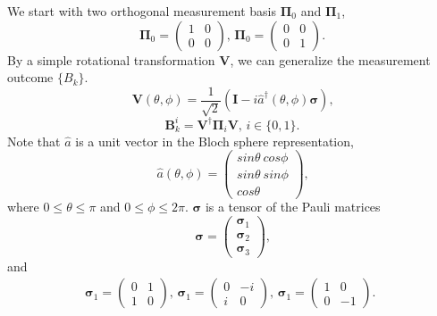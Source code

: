 \documentclass[%
 reprint,
 amsmath,amssymb,
 aps,
]{revtex4-1}
\begin{document}
We start with two orthogonal measurement basis $\boldsymbol{\Pi}_0$ and $\boldsymbol{\Pi}_1$,
\begin{equation}
\boldsymbol{\Pi}_0 = 
\left( \begin{array}{cc}
1 & 0 \\
0 & 0 \end{array} \right) \text{, }
\boldsymbol{\Pi}_0 = 
\left( \begin{array}{cc}
0 & 0 \\
0 & 1 \end{array} \right) \text{.}
\end{equation}
\noindent By a simple rotational transformation $\textbf{V}$, we can generalize the measurement outcome $\{B_k\}$.
\begin{equation}
\textbf{V}(\theta,\phi) = \frac{1}{\sqrt{2}} (\textbf{I} - i \hat{a}^{\dagger}(\theta,\phi) \boldsymbol{\sigma} ) \text{,}
\end{equation}
\begin{equation}
\textbf{B}_k^i  = \textbf{V}^{\dagger} \boldsymbol{\Pi}_i \textbf{V} \text{, } i \in \{0, 1\} \text{.}
\end{equation}
\noindent Note that $\hat{a}$ is a unit vector in the Bloch sphere representation,
\begin{equation}
\hat{a}(\theta,\phi) = \left( \begin{array}{c}
sin \theta \  cos \phi \\
sin \theta \  sin \phi \\
cos \theta
\end{array} \right) \text{,}
\end{equation}
\noindent where $0 \le \theta \le \pi$ and $0 \le \phi \le 2\pi$. $\boldsymbol{\sigma}$ is a tensor of the Pauli matrices
\begin{equation}
\boldsymbol{\sigma} = \left( \begin{array}{c}
\boldsymbol{\sigma}_1 \\
\boldsymbol{\sigma}_2 \\
\boldsymbol{\sigma}_3
\end{array} \right) \text{,}
\end{equation}
\noindent and
\begin{eqnarray}
\boldsymbol{\sigma}_1 = \left( \begin{array}{cc}
0 & 1 \\
1 & 0
\end{array} \right) \text{, }
\boldsymbol{\sigma}_1 = \left( \begin{array}{cc}
0 & -i \\
i & 0
\end{array} \right) \text{, }
\boldsymbol{\sigma}_1 = \left( \begin{array}{cc}
1 & 0 \\
0 & -1
\end{array} \right) \text{. }
\end{eqnarray}
\end{document}
